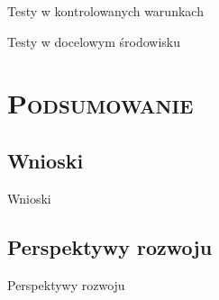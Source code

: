 \documentclass[xcolor=x11names,compress]{beamer}
\renewcommand{\(}{\begin{columns}}
\renewcommand{\)}{\end{columns}}
\newcommand{\<}[1]{\begin{column}{#1}}
\renewcommand{\>}{\end{column}}
\begin{document}
\begin{frame}{Testy w kontrolowanych warunkach}

\end{frame}

\begin{frame}{Testy w docelowym środowisku}

\end{frame}

\section{\scshape Podsumowanie}

\subsection*{Wnioski}
\begin{frame}{Wnioski}

\end{frame}

\subsection*{Perspektywy rozwoju}
\begin{frame}{Perspektywy rozwoju}

\end{frame}


\end{document}
